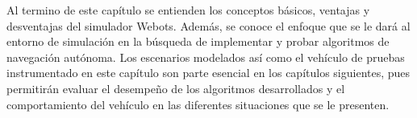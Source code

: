 Al termino de este capítulo se entienden los conceptos básicos, ventajas y desventajas del simulador Webots. Además, se conoce el enfoque que se le dará al entorno de simulación en la búsqueda de implementar y probar algoritmos de navegación autónoma. Los escenarios modelados así como el vehículo de pruebas instrumentado en este capítulo son parte esencial en los capítulos siguientes, pues permitirán evaluar el desempeño de los algoritmos desarrollados y el comportamiento del vehículo en las diferentes situaciones que se le presenten.